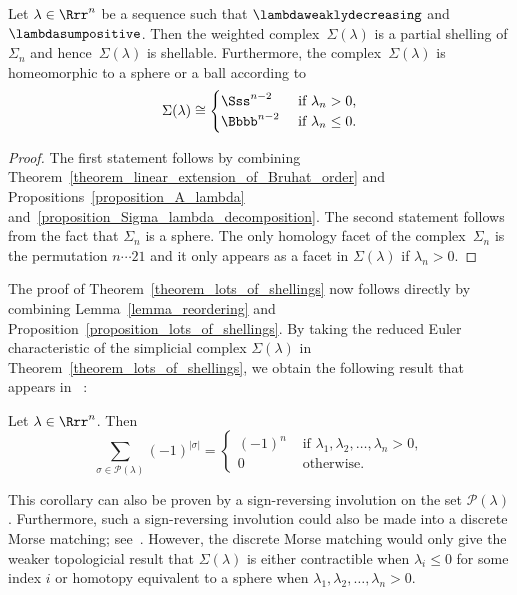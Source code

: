 \begin{prop}
Let $\lambda \in \Rrr^{n}$ be a sequence such that
$\lambdaweaklydecreasing$ and 
$\lambdasumpositive$.
Then the weighted complex~$\Sigma(\lambda)$
is a partial shelling of $\Sigma_{n}$
and hence~$\Sigma(\lambda)$ is shellable.
Furthermore,
the complex~$\Sigma(\lambda)$ is homeomorphic to a sphere or a ball
according to
$$
\Sigma(\lambda)
\cong
\begin{cases}
\Sss^{n-2} & \text{ if } \lambda_{n} > 0, \\
\Bbbb^{n-2} & \text{ if } \lambda_{n} \leq 0.
\end{cases}
$$
\label{proposition_lots_of_shellings}
\end{prop}
\begin{proof}
The first statement follows by combining
Theorem~\ref{theorem_linear_extension_of_Bruhat_order}
and
Propositions~\ref{proposition_A_lambda}
and~\ref{proposition_Sigma_lambda_decomposition}.
The second statement follows
from the fact that $\Sigma_{n}$ is a sphere.
The only homology facet of the complex~$\Sigma_{n}$
is the permutation $n \cdots 21$
and it only appears as a facet in
$\Sigma(\lambda)$ if $\lambda_{n} > 0$.
\end{proof}



The proof of Theorem~\ref{theorem_lots_of_shellings}
now follows directly by combining
Lemma~\ref{lemma_reordering}
and
Proposition~\ref{proposition_lots_of_shellings}.
By taking the reduced Euler characteristic
of the simplicial complex $\Sigma(\lambda)$ in
Theorem~\ref{theorem_lots_of_shellings},
we obtain the following result 
that appears in~\cite[Corollary~A.3]{Morel} :


\begin{coro}
Let $\lambda \in \Rrr^{n}$.
Then
$$
   \sum_{\sigma \in \mathcal{P}(\lambda)} (-1)^{|\sigma|} =
   \begin{cases}
   (-1)^{n}   & \text{ if  } \lambda_{1}, \lambda_{2}, \ldots, \lambda_{n} > 0,  \\
   0        & \text{ otherwise. }
   \end{cases}
$$
\end{coro}

This corollary can also be proven by a sign-reversing involution
on the set $\mathcal{P}(\lambda)$. 
Furthermore, such a sign-reversing involution could
also be made into a discrete Morse matching;
see~\cite{Forman}.
However, the discrete Morse matching would only
give the weaker topologicial result that $\Sigma(\lambda)$
is either contractible when $\lambda_{i} \leq 0$
for some index $i$
or
homotopy equivalent to a sphere when
$\lambda_{1}, \lambda_{2}, \ldots, \lambda_{n} > 0$.


